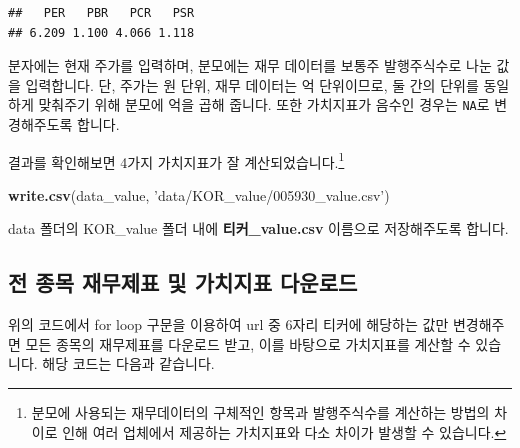 \documentclass[12pt,]{book}
\newenvironment{Shaded}{\begin{snugshade}}{\end{snugshade}}
\newcommand{\KeywordTok}[1]{\textcolor[rgb]{0.13,0.29,0.53}{\textbf{#1}}}
\newcommand{\NormalTok}[1]{#1}
\newcommand{\StringTok}[1]{\textcolor[rgb]{0.31,0.60,0.02}{#1}}
\let\rmarkdownfootnote\footnote%
\def\footnote{\protect\rmarkdownfootnote}
\begin{document}
\begin{verbatim}
##   PER   PBR   PCR   PSR 
## 6.209 1.100 4.066 1.118
\end{verbatim}

분자에는 현재 주가를 입력하며, 분모에는 재무 데이터를 보통주 발행주식수로 나눈 값을 입력합니다. 단, 주가는 원 단위, 재무 데이터는 억 단위이므로, 둘 간의 단위를 동일하게 맞춰주기 위해 분모에 억을 곱해 줍니다. 또한 가치지표가 음수인 경우는 \texttt{NA}로 변경해주도록 합니다.

결과를 확인해보면 4가지 가치지표가 잘 계산되었습니다.\footnote{분모에 사용되는 재무데이터의 구체적인 항목과 발행주식수를 계산하는 방법의 차이로 인해 여러 업체에서 제공하는 가치지표와 다소 차이가 발생할 수 있습니다.}

\begin{Shaded}
\begin{Highlighting}[]
\KeywordTok{write.csv}\NormalTok{(data_value, }\StringTok{'data/KOR_value/005930_value.csv'}\NormalTok{)}
\end{Highlighting}
\end{Shaded}

data 폴더의 KOR\_value 폴더 내에 \textbf{티커\_value.csv} 이름으로 저장해주도록 합니다.

\hypertarget{section-30}{%
\subsection{전 종목 재무제표 및 가치지표 다운로드}\label{section-30}}

위의 코드에서 for loop 구문을 이용하여 url 중 6자리 티커에 해당하는 값만 변경해주면 모든 종목의 재무제표를 다운로드 받고, 이를 바탕으로 가치지표를 계산할 수 있습니다. 해당 코드는 다음과 같습니다.
\end{document}

